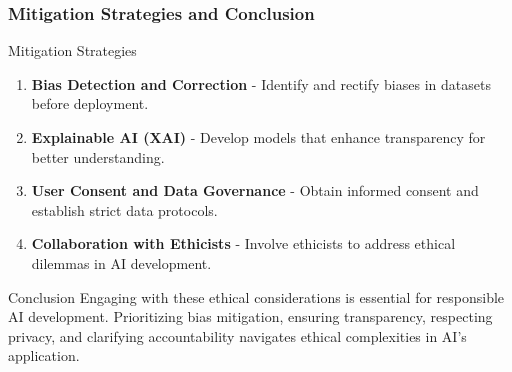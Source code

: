 \documentclass[aspectratio=169]{beamer}
\begin{document}
\begin{frame}[fragile]
    \frametitle{Mitigation Strategies and Conclusion}
    \begin{block}{Mitigation Strategies}
        \begin{enumerate}
            \item \textbf{Bias Detection and Correction} - Identify and rectify biases in datasets before deployment.
            \item \textbf{Explainable AI (XAI)} - Develop models that enhance transparency for better understanding.
            \item \textbf{User Consent and Data Governance} - Obtain informed consent and establish strict data protocols.
            \item \textbf{Collaboration with Ethicists} - Involve ethicists to address ethical dilemmas in AI development.
        \end{enumerate}
    \end{block}

    \begin{block}{Conclusion}
        Engaging with these ethical considerations is essential for responsible AI development. Prioritizing bias mitigation, ensuring transparency, respecting privacy, and clarifying accountability navigates ethical complexities in AI's application.
    \end{block}
\end{frame}
\end{document}

